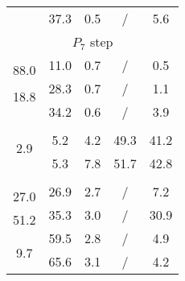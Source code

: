 \begin{tabular}{|ccccc|}
 & \multirow{2}{*}{37.3} & \multirow{2}{*}{0.5} & \multirow{2}{*}{/} & \multirow{2}{*}{5.6} \\ %
 & & & & \\ \hline \hline
\multicolumn{5}{|c|}{\multirow{2}{*}{$P_7$ step}} \\
\multicolumn{5}{|c|}{} \\ \hline
 & \multirow{2}{*}{11.0} & \multirow{2}{*}{0.7} & \multirow{2}{*}{/} & \multirow{2}{*}{0.5} \\ %
\multirow{2}{*}{88.0} & & & & \\ \cline{2-5} 
 & \multirow{2}{*}{28.3} & \multirow{2}{*}{0.7} & \multirow{2}{*}{/} & \multirow{2}{*}{1.1} \\ %
\multirow{2}{*}{18.8} & & & & \\ \cline{2-5} 
 & \multirow{2}{*}{34.2} & \multirow{2}{*}{0.6} & \multirow{2}{*}{/} & \multirow{2}{*}{3.9} \\ %
 & & & & \\ \hline \hline
\multicolumn{5}{|c|}{\multirow{2}{*}{\citet{Adhikari2002}}} \\
\multicolumn{5}{|c|}{} \\ \hline
 & \multirow{2}{*}{5.2} & \multirow{2}{*}{4.2} & \multirow{2}{*}{49.3} & \multirow{2}{*}{41.2} \\ %
\multirow{2}{*}{2.9} & & & & \\ \cline{2-5} 
 & \multirow{2}{*}{5.3} & \multirow{2}{*}{7.8} & \multirow{2}{*}{51.7} & \multirow{2}{*}{42.8} \\ %
 & & & & \\ \hline \hline
\multicolumn{5}{|c|}{\multirow{2}{*}{\citet{erlicher_modal_2007}}} \\
\multicolumn{5}{|c|}{} \\ \hline
 & \multirow{2}{*}{26.9} & \multirow{2}{*}{2.7} & \multirow{2}{*}{/} & \multirow{2}{*}{7.2} \\ %
\multirow{2}{*}{27.0} & & & & \\ \cline{2-5} 
 & \multirow{2}{*}{35.3} & \multirow{2}{*}{3.0} & \multirow{2}{*}{/} & \multirow{2}{*}{30.9} \\ %
\multirow{2}{*}{51.2} & & & & \\ \cline{2-5} 
 & \multirow{2}{*}{59.5} & \multirow{2}{*}{2.8} & \multirow{2}{*}{/} & \multirow{2}{*}{4.9} \\ %
\multirow{2}{*}{9.7} & & & & \\ \cline{2-5} 
 & \multirow{2}{*}{65.6} & \multirow{2}{*}{3.1} & \multirow{2}{*}{/} & \multirow{2}{*}{4.2} \\ %

\end{tabular}
